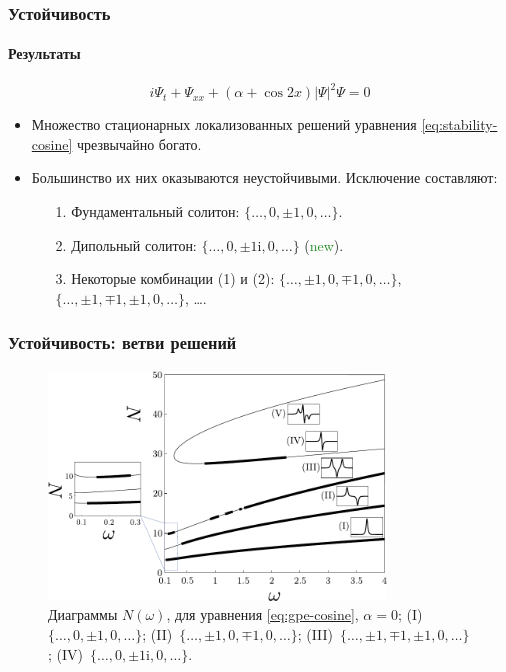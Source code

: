\documentclass [10pt] {beamer}
\begin{document}
\begin{frame}
	\frametitle{Устойчивость}
	\framesubtitle{Результаты}
	
	\begin{equation}
		i \Psi_t + \Psi_{xx} + (\alpha + \cos 2x) |\Psi|^2 \Psi = 0
		\label{eq:stability-cosine}	
	\end{equation}
	
	\begin{itemize}
		\item Множество стационарных локализованных решений уравнения \eqref{eq:stability-cosine} чрезвычайно богато.
		\item Большинство их них оказываются неустойчивыми.
			Исключение составляют:
			\begin{enumerate}
				\item[1.] Фундаментальный солитон: $\{ \dots, 0, \pm 1, 0, \dots \}$.
				\item[2.] Дипольный солитон: $\{ \dots, 0, \pm 1\mathrm{i}, 0, \dots \}$ (\textcolor{forestgreen}{new}).
				\item[3.] Некоторые комбинации {\color{ceruleanblue} (1)} и {\color{ceruleanblue} (2)}: $\{ \dots, \pm 1, 0, \mp 1, 0, \dots \}$, $\{ \dots, \pm 1, \mp 1, \pm 1, 0, \dots \}$, \dots.
			\end{enumerate}
	\end{itemize}
\end{frame}

\begin{frame}
	\frametitle{Устойчивость: ветви решений}
	
	\begin{figure}[h]
	\includegraphics[width = 0.8\textwidth]{pic/branches for cosine equation}
	\caption{
		Диаграммы $N(\omega)$, для уравнения \eqref{eq:gpe-cosine}, $\alpha = 0$;
		(I)~$\{ \dots, 0, \pm 1, 0, \dots \}$; (II)~$\{ \dots, \pm 1, 0, \mp 1, 0, \dots \}$; (III)~$\{ \dots, \pm 1, \mp 1, \pm 1, 0, \dots \}$; (IV)~$\{ \dots, 0, \pm 1\mathrm{i}, 0, \dots \}$.
	}
	\end{figure}
\end{frame}
\end{document}
